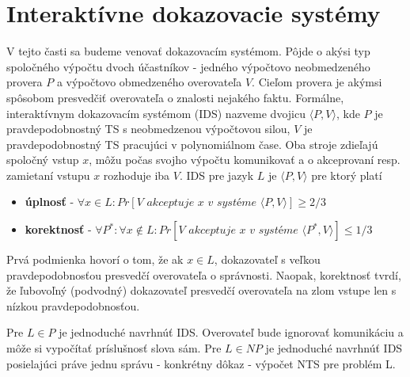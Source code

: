 \section{Interaktívne dokazovacie systémy}

V tejto časti sa budeme venovať dokazovacím systémom. Pôjde o akýsi
typ spoločného výpočtu dvoch účastníkov - jedného výpočtovo
neobmedzeného provera $P$ a výpočtovo obmedzeného overovateľa $V$.
Cieľom provera je akýmsi spôsobom presvedčiť overovateľa o znalosti
nejakého faktu.
Formálne,
interaktívnym dokazovacím systémom (IDS) nazveme dvojicu
$\langle P,V \rangle$, kde $P$ je pravdepodobnostný TS s neobmedzenou výpočtovou silou,
$V$ je pravdepodobnostný TS pracujúci v polynomiálnom čase.
Oba stroje zdieľajú spoločný vstup $x$, môžu počas svojho výpočtu
komunikovať a o akceprovaní resp. zamietaní vstupu $x$ rozhoduje iba
$V$.
IDS pre jazyk $L$ je $\langle P,V \rangle$ pre ktorý platí
\begin{itemize}
\item {\bf úplnosť} - $\forall x \in L: 
    Pr[V\textit{ akceptuje } x \textit{ v systéme } 
        \langle P,V \rangle ] \ge 2/3$
\item {\bf korektnosť} - $\forall P^*: \forall x \not \in L: 
    Pr[V\textit{ akceptuje } x \textit{ v systéme } 
        \langle P^*,V \rangle ] \le 1/3$
\end{itemize}
Prvá podmienka hovorí o tom, že ak $x\in L$, dokazovateľ s veľkou
pravdepodobnosťou presvedčí overovateľa o správnosti.
Naopak, korektnosť tvrdí, že ľubovoľný (podvodný) dokazovateľ
presvedčí overovateľa na zlom vstupe len s nízkou pravdepodobnosťou.

\begin{komentar}
    Pre $L \in P$ je jednoduché navrhnúť IDS. Overovateľ bude ignorovať
    komunikáciu a môže si vypočítať príslušnosť slova sám.
    Pre $L \in NP$ je jednoduché navrhnúť IDS posielajúci práve jednu
    správu - konkrétny dôkaz - výpočet NTS pre problém L.
\end{komentar}

